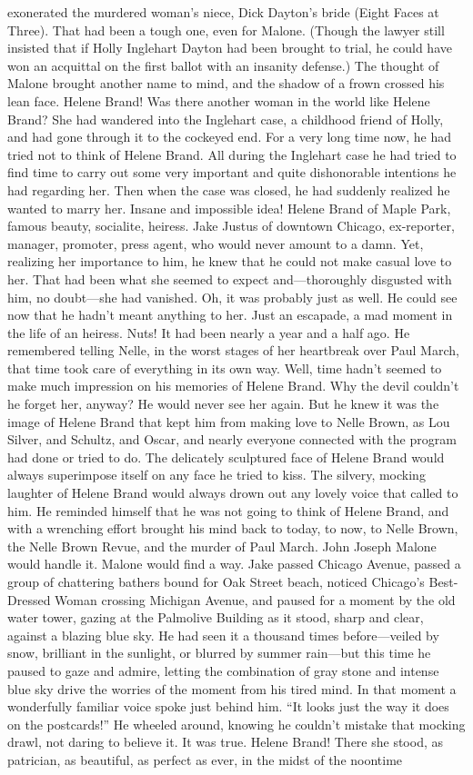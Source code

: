 \documentclass{novel}
\begin{document}
exonerated the murdered woman’s niece, Dick Dayton’s bride (Eight Faces at Three). That had been a tough one, even for Malone. (Though the lawyer still insisted that if Holly Inglehart Dayton had been brought to trial, he could have won an acquittal on the first ballot with an insanity defense.) The thought of Malone brought another name to mind, and the shadow of a frown crossed his lean face. Helene Brand! Was there another woman in the world like Helene Brand? She had wandered into the Inglehart case, a childhood friend of Holly, and had gone through it to the cockeyed end. For a very long time now, he had tried not to think of Helene Brand. All during the Inglehart case he had tried to find time to carry out some very important and quite dishonorable intentions he had regarding her. Then when the case was closed, he had suddenly realized he wanted to marry her. Insane and impossible idea! Helene Brand of Maple Park, famous beauty, socialite, heiress. Jake Justus of downtown Chicago, ex-reporter, manager, promoter, press agent, who would never amount to a damn. Yet, realizing her importance to him, he knew that he could not make casual love to her. That had been what she seemed to expect and—thoroughly disgusted with him, no doubt—she had vanished. Oh, it was probably just as well. He could see now that he hadn’t meant anything to her. Just an escapade, a mad moment in the life of an heiress. Nuts! It had been nearly a year and a half ago. He remembered telling Nelle, in the worst stages of her heartbreak over Paul March, that time took care of everything in its own way. Well, time hadn’t seemed to make much impression on his memories of Helene Brand. Why the devil couldn’t he forget her, anyway? He would never see her again. But he knew it was the image of Helene Brand that kept him from making love to Nelle Brown, as Lou Silver, and Schultz, and Oscar, and nearly everyone connected with the program had done or tried to do. The delicately sculptured face of Helene Brand would always superimpose itself on any face he tried to kiss. The silvery, mocking laughter of Helene Brand would always drown out any lovely voice that called to him. He reminded himself that he was not going to think of Helene Brand, and with a wrenching effort brought his mind back to today, to now, to Nelle Brown, the Nelle Brown Revue, and the murder of Paul March. John Joseph Malone would handle it. Malone would find a way. Jake passed Chicago Avenue, passed a group of chattering bathers bound for Oak Street beach, noticed Chicago’s Best-Dressed Woman crossing Michigan Avenue, and paused for a moment by the old water tower, gazing at the Palmolive Building as it stood, sharp and clear, against a blazing blue sky. He had seen it a thousand times before—veiled by snow, brilliant in the sunlight, or blurred by summer rain—but this time he paused to gaze and admire, letting the combination of gray stone and intense blue sky drive the worries of the moment from his tired mind. In that moment a wonderfully familiar voice spoke just behind him. “It looks just the way it does on the postcards!” He wheeled around, knowing he couldn’t mistake that mocking drawl, not daring to believe it. It was true. Helene Brand! There she stood, as patrician, as beautiful, as perfect as ever, in the midst of the noontime 
\end{document}
